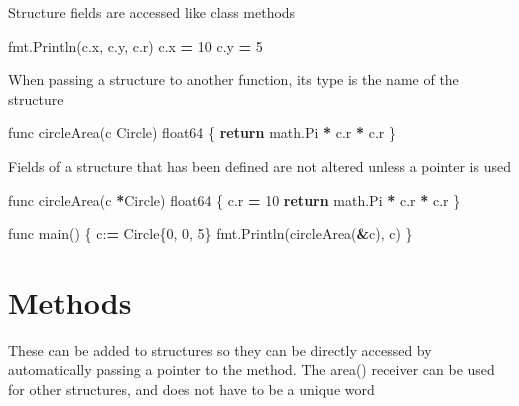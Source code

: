 \documentclass[]{book}
\newenvironment{Shaded}{\begin{snugshade}}{\end{snugshade}}
\newcommand{\DecValTok}[1]{\textcolor[rgb]{0.00,0.00,0.81}{#1}}
\newcommand{\ControlFlowTok}[1]{\textcolor[rgb]{0.13,0.29,0.53}{\textbf{#1}}}
\newcommand{\OperatorTok}[1]{\textcolor[rgb]{0.81,0.36,0.00}{\textbf{#1}}}
\newcommand{\NormalTok}[1]{#1}
\begin{document}
Structure fields are accessed like class methods

\begin{Shaded}
\begin{Highlighting}[]
\NormalTok{fmt.Println(c.x, c.y, c.r)}
\NormalTok{c.x }\OperatorTok{=} \DecValTok{10}
\NormalTok{c.y }\OperatorTok{=} \DecValTok{5}
\end{Highlighting}
\end{Shaded}

When passing a structure to another function, its type is the name of
the structure

\begin{Shaded}
\begin{Highlighting}[]
\NormalTok{func circleArea(c Circle) float64 \{}
    \ControlFlowTok{return}\NormalTok{ math.Pi }\OperatorTok{*}\NormalTok{ c.r }\OperatorTok{*}\NormalTok{ c.r     }
\NormalTok{\}                                  }
\end{Highlighting}
\end{Shaded}

Fields of a structure that has been defined are not altered unless a
pointer is used

\begin{Shaded}
\begin{Highlighting}[]
\NormalTok{func circleArea(c }\OperatorTok{*}\NormalTok{Circle) float64 \{}
\NormalTok{    c.r }\OperatorTok{=} \DecValTok{10}                        
    \ControlFlowTok{return}\NormalTok{ math.Pi }\OperatorTok{*}\NormalTok{ c.r }\OperatorTok{*}\NormalTok{ c.r      }
\NormalTok{\}                                   }
                                    
\NormalTok{func main() \{                       }
\NormalTok{    c:}\OperatorTok{=}\NormalTok{ Circle\{}\DecValTok{0}\NormalTok{, }\DecValTok{0}\NormalTok{, }\DecValTok{5}\NormalTok{\}             }
\NormalTok{    fmt.Println(circleArea(}\OperatorTok{&}\NormalTok{c), c)  }
\NormalTok{\}}
\end{Highlighting}
\end{Shaded}

\section{Methods}\label{methods}

These can be added to structures so they can be directly accessed by
automatically passing a pointer to the method. The area() receiver can
be used for other structures, and does not have to be a unique word
\end{document}
